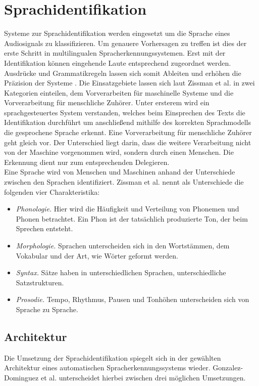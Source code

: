 \section{Sprachidentifikation}
Systeme zur Sprachidentifikation werden eingesetzt um die Sprache eines Audiosignals zu klassifizieren. Um genauere Vorhersagen zu treffen ist dies der erste Schritt in multilingualen Spracherkennungssystemen. Erst mit der Identifikation können eingehende Laute entsprechend zugeordnet werden. Ausdrücke und Grammatikregeln lassen sich somit Ableiten und erhöhen die Präzision der Systeme \cite{Bartz.2017}.
Die Einsatzgebiete lassen sich laut Zissman et al. \cite{Zissman.2001} in zwei Kategorien einteilen, dem Vorverarbeiten für maschinelle Systeme und die Vorverarbeitung für menschliche Zuhörer. Unter ersterem wird ein sprachgesteuertes System verstanden, welches beim Einsprechen des Texts die Identifikation durchführt um anschließend mithilfe des korrekten Sprachmodells die gesprochene Sprache erkennt. Eine Vorverarbeitung für menschliche Zuhörer geht gleich vor. Der Unterschied liegt darin, dass die weitere Verarbeitung nicht von der Maschine vorgenommen wird, sondern durch einen Menschen. Die Erkennung dient nur zum entsprechenden Delegieren.
\\
Eine Sprache wird von Menschen und Maschinen anhand der Unterschiede zwischen den Sprachen identifiziert. Zissman et al. \cite{Zissman.2001} nennt als Unterschiede die folgenden vier Charakteristika:
\begin{itemize}
\item \textit{Phonologie.} Hier wird die Häufigkeit und Verteilung von Phonemen und Phonen betrachtet. Ein Phon ist der tatsächlich produzierte Ton, der beim Sprechen entsteht.
\item \textit{Morphologie.} Sprachen unterscheiden sich in den Wortstämmen, dem Vokabular und der Art, wie Wörter geformt werden.
\item \textit{Syntax.} Sätze haben in unterschiedlichen Sprachen, unterschiedliche Satzstrukturen.
\item \textit{Prosodie.} Tempo, Rhythmus, Pausen und Tonhöhen unterscheiden sich von Sprache zu Sprache.
\end{itemize}

\subsection{Architektur}
Die Umsetzung der Sprachidentifikation spiegelt sich in der gewählten Architektur eines automatischen Spracherkennungssystems wieder. Gonzalez-Dominguez et al. \cite{Gonzalez.2015} unterscheidet hierbei zwischen drei möglichen Umsetzungen.


